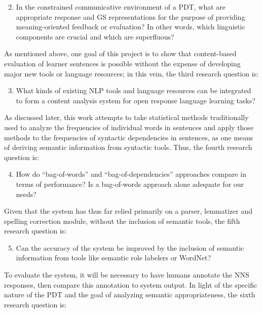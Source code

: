\begin{enumerate}\setcounter{enumi}{1}
\item{In the constrained communicative environment of a PDT, what are appropriate response and GS representations for the purpose of providing meaning-oriented feedback or evaluation? In other words, which linguistic components are crucial and which are superfluous?}
\end{enumerate}
As mentioned above, one goal of this project is to show that content-based evaluation of learner sentences is possible without the expense of developing major new tools or language resources; in this vein, the third research question is: 

\begin{enumerate}\setcounter{enumi}{2}
\item{What kinds of existing NLP tools and language resources can be integrated to form a content analysis system for open response language learning tasks?}
\end{enumerate}
As discussed later, this work attempts to take statistical methods traditionally used to analyze the frequencies of individual words in sentences and apply those methods to the frequencies of syntactic dependencies in sentences, as one means of deriving semantic information from syntactic tools. Thus, the fourth research question is:

\begin{enumerate}\setcounter{enumi}{3}
\item{How do ``bag-of-words'' and ``bag-of-dependencies'' approaches compare in terms of performance? Is a bag-of-words approach alone adequate for our needs?}
\end{enumerate}
Given that the system has thus far relied primarily on a parser, lemmatizer and spelling correction module, without the inclusion of semantic tools, the fifth research question is: %

\begin{enumerate}\setcounter{enumi}{4}
\item{Can the accuracy of the system be improved by the inclusion of semantic information from tools like semantic role labelers or WordNet?}
\end{enumerate}
To evaluate the system, it will be necessary to have humans annotate the NNS responses, then compare this annotation to system output. In light of the specific nature of the PDT and the goal of analyzing semantic appropriateness, the sixth research question is:

